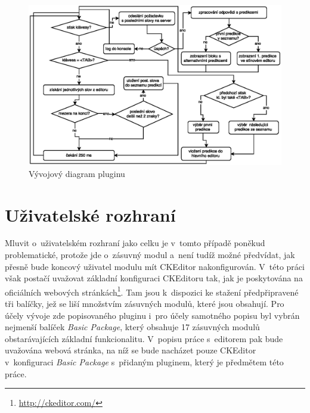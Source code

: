 \documentclass[a4paper,11pt,openany]{book} %
\begin{document}
\begin{figure}[h]
	\centering
	\includegraphics[width=1.0\textwidth]{autocomplete_floatchart.eps}
	\caption{Vývojový diagram pluginu}
	\label{fig:phoneKeyboard}
\end{figure}

\section{Uživatelské rozhraní}\label{ui}

Mluvit o~uživatelském rozhraní jako celku je v~tomto případě poněkud problematické, protože jde o~zásuvný modul a~není tudíž možné předvídat, jak přesně bude koncový uživatel modulu mít CKEditor nakonfigurován. V~této práci však postačí uvažovat základní konfiguraci CKEditoru tak, jak je poskytována na oficiálních webových stránkách\footnote{\url{http://ckeditor.com/}}. Tam jsou k~dispozici ke stažení předpřipravené tři balíčky, jež se liší množstvím zásuvných modulů, které jsou obsahují. Pro účely vývoje zde popisovaného pluginu i~pro účely samotného popisu byl vybrán nejmenší balíček {\it Basic Package}, který obsahuje 17 zásuvných modulů obstarávajících základní funkcionalitu. V~popisu práce s~editorem pak bude uvažována webová stránka, na níž se bude nacházet pouze CKEditor v~konfiguraci {\it Basic Package} s~přidaným pluginem, který je předmětem této práce.
\end{document}
